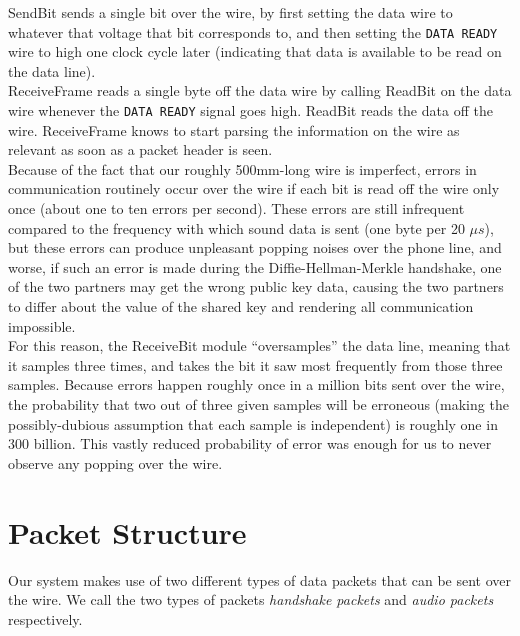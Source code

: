 \documentclass[a4paper]{report}
\begin{document}
SendBit sends a single bit over the wire, by first setting the data wire to whatever that voltage that bit corresponds to, and then setting the \verb|DATA READY| wire to high one clock cycle later (indicating that data is available to be read on the data line). \\

ReceiveFrame reads a single byte off the data wire by calling ReadBit on the data wire whenever the \verb|DATA READY| signal goes high. ReadBit reads the data off the wire. ReceiveFrame knows to start parsing the information on the wire as relevant as soon as a packet header is seen. \\

Because of the fact that our roughly 500mm-long wire is imperfect, errors in communication routinely occur over the wire if each bit is read off the wire only once (about one to ten errors per second). These errors are still infrequent compared to the frequency with which sound data is sent (one byte per 20 $\mu s$), but these errors can produce unpleasant popping noises over the phone line, and worse, if such an error is made during the Diffie-Hellman-Merkle handshake, one of the two partners may get the wrong public key data, causing the two partners to differ about the value of the shared key and rendering all communication impossible. \\

For this reason, the ReceiveBit module ``oversamples'' the data line, meaning that it samples three times, and takes the bit it saw most frequently from those three samples. Because errors happen roughly once in a million bits sent over the wire, the probability that two out of three given samples will %
 be erroneous (making the possibly-dubious assumption that each sample is independent) is roughly one in 300 billion. This vastly reduced probability of error was enough for us to never observe any popping over the wire.

\section{Packet Structure}

Our system makes use of two different types of data packets that can be sent over the wire. We call the two types of packets \emph{handshake packets} and \emph{audio packets} respectively.  \\
\end{document}
